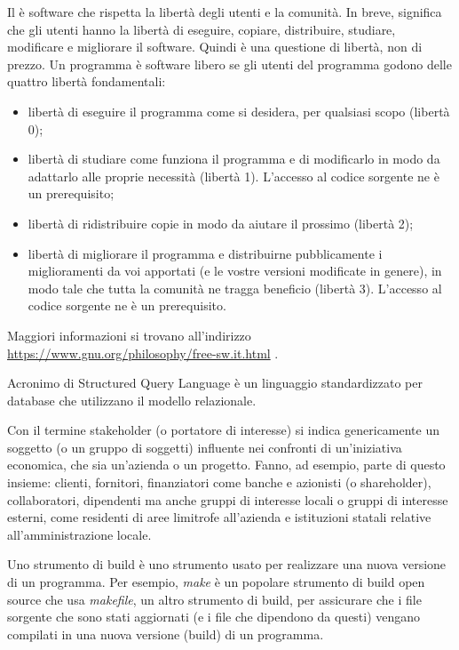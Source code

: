 Il  è software che rispetta la libertà degli utenti e la comunità. In breve, significa che gli utenti hanno la libertà di eseguire, copiare, distribuire, studiare, modificare e migliorare il software. Quindi è una questione di libertà, non di prezzo.
Un programma è software libero se gli utenti del programma godono delle quattro libertà fondamentali:
\begin{itemize}
    \item libertà di eseguire il programma come si desidera, per qualsiasi scopo (libertà 0);
    \item libertà di studiare come funziona il programma e di modificarlo in modo da adattarlo alle proprie necessità (libertà 1). L'accesso al codice sorgente ne è un prerequisito;
    \item libertà di ridistribuire copie in modo da aiutare il prossimo (libertà 2);
    \item libertà di migliorare il programma e distribuirne pubblicamente i miglioramenti da voi apportati (e le vostre versioni modificate in genere), in modo tale che tutta la comunità ne tragga beneficio (libertà 3). L'accesso al codice sorgente ne è un prerequisito.
\end{itemize}
Maggiori informazioni si trovano all'indirizzo \url{https://www.gnu.org/philosophy/free-sw.it.html} .

Acronimo di Structured Query Language è un linguaggio standardizzato per database che utilizzano il modello relazionale.

Con il termine stakeholder (o portatore di interesse) si indica genericamente un soggetto (o un gruppo di soggetti) influente nei confronti di un'iniziativa economica, che sia un'azienda o un progetto.
Fanno, ad esempio, parte di questo insieme: clienti, fornitori, finanziatori come banche e azionisti (o shareholder), collaboratori, dipendenti ma anche gruppi di interesse locali o gruppi di interesse esterni, come residenti di aree limitrofe all'azienda e istituzioni statali relative all'amministrazione locale.

Uno strumento di build è uno strumento usato per realizzare una nuova versione di un programma. Per esempio, \textit{make} è un popolare strumento di build open source che usa \textit{makefile}, un altro strumento di build, per assicurare che i file sorgente che sono stati aggiornati (e i file che dipendono da questi) vengano compilati in una nuova versione (build) di un programma.

